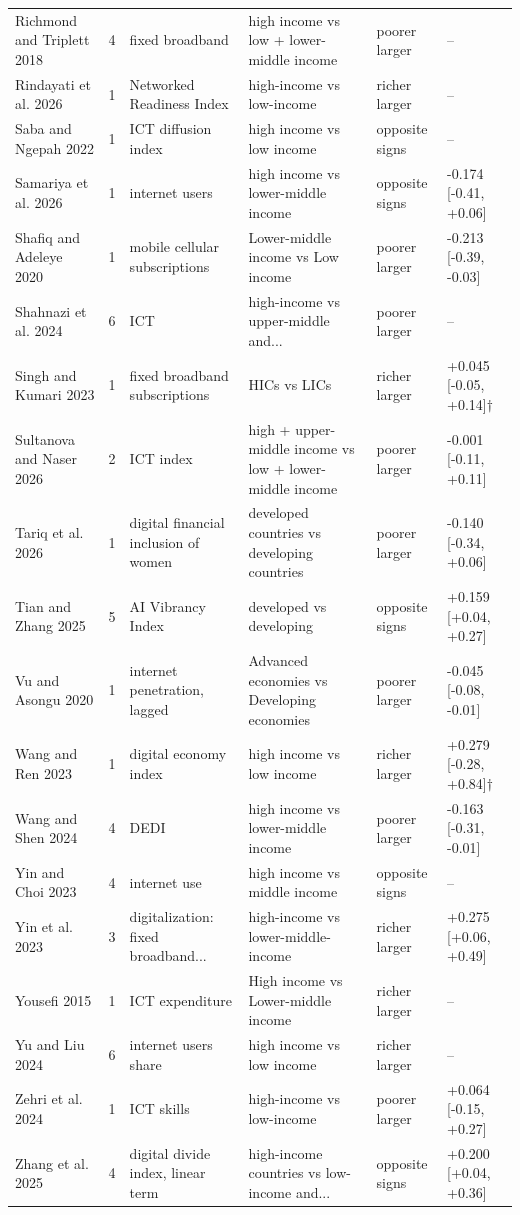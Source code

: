 {\begin{longtable}{@{}p{3.0cm} p{0.4cm} p{3.3cm} p{3.7cm} p{1.8cm} p{2.9cm}@{}}
Richmond and Triplett 2018 & 4 & fixed broadband & high income vs low + lower-middle income & poorer larger & --\\
Rindayati et al. 2026 & 1 & Networked Readiness Index & high-income vs low-income & richer larger & --\\
Saba and Ngepah 2022 & 1 & ICT diffusion index & high income vs low income & opposite signs & --\\
Samariya et al. 2026 & 1 & internet users & high income vs lower-middle income & opposite signs & -0.174 [-0.41, +0.06]\\
Shafiq and Adeleye 2020 & 1 & mobile cellular subscriptions & Lower-middle income vs Low income & poorer larger & -0.213 [-0.39, -0.03]\\
Shahnazi et al. 2024 & 6 & ICT & high-income vs upper-middle and... & poorer larger & --\\
Singh and Kumari 2023 & 1 & fixed broadband subscriptions & HICs vs LICs & richer larger & +0.045 [-0.05, +0.14]$\dagger$\\
Sultanova and Naser 2026 & 2 & ICT index & high + upper-middle income vs low + lower-middle income & poorer larger & -0.001 [-0.11, +0.11]\\
Tariq et al. 2026 & 1 & digital financial inclusion of women & developed countries vs developing countries & poorer larger & -0.140 [-0.34, +0.06]\\
Tian and Zhang 2025 & 5 & AI Vibrancy Index & developed vs developing & opposite signs & +0.159 [+0.04, +0.27]\\
Vu and Asongu 2020 & 1 & internet penetration, lagged & Advanced economies vs Developing economies & poorer larger & -0.045 [-0.08, -0.01]\\
Wang and Ren 2023 & 1 & digital economy index & high income vs low income & richer larger & +0.279 [-0.28, +0.84]$\dagger$\\
Wang and Shen 2024 & 4 & DEDI & high income vs lower-middle income & poorer larger & -0.163 [-0.31, -0.01]\\
Yin and Choi 2023 & 4 & internet use & high income vs middle income & opposite signs & --\\
Yin et al. 2023 & 3 & digitalization: fixed broadband... & high-income vs lower-middle-income & richer larger & +0.275 [+0.06, +0.49]\\
Yousefi 2015 & 1 & ICT expenditure & High income vs Lower-middle income & richer larger & --\\
Yu and Liu 2024 & 6 & internet users share & high income vs low income & richer larger & --\\
Zehri et al. 2024 & 1 & ICT skills & high-income vs low-income & poorer larger & +0.064 [-0.15, +0.27]\\
Zhang et al. 2025 & 4 & digital divide index, linear term & high-income countries vs low-income and... & opposite signs & +0.200 [+0.04, +0.36]\\
\end{longtable}}
